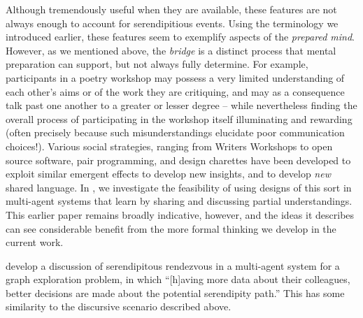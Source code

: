 Although tremendously useful when they are available, these features
are not always enough to account for serendipitious events.  Using the
terminology we introduced earlier, these features seem to exemplify
aspects of the \emph{prepared mind}.  However, as we mentioned above,
the \emph{bridge} is a distinct process that mental preparation can
support, but not always fully determine.  For example, participants in
a poetry workshop may possess a very limited understanding of each
other's aims or of the work they are critiquing, and may as a
consequence talk past one another to a greater or lesser degree --
while nevertheless finding the overall process of participating in the
workshop itself illuminating and rewarding (often precisely because
such misunderstandings elucidate poor communication choices!).
Various social strategies, ranging from Writers Workshops to open
source software, pair programming, and design charettes
\cite[p. 11]{gabriel2002writer} have been developed to exploit similar
emergent effects to develop new insights, and to develop \emph{new}
shared language.  In \cite{poetry-workshop}, we investigate the
feasibility of using designs of this sort in multi-agent systems that
learn by sharing and discussing partial understandings.  This earlier
paper remains broadly indicative, however, and the ideas it describes
can see considerable benefit from the more formal thinking we develop
in the current work.  

 develop a discussion of serendipitous
rendezvous in a multi-agent system for a graph exploration problem, in
which ``[h]aving more data about their colleagues, better decisions
are made about the potential serendipity path.''  This has some
similarity to the discursive scenario described above.

